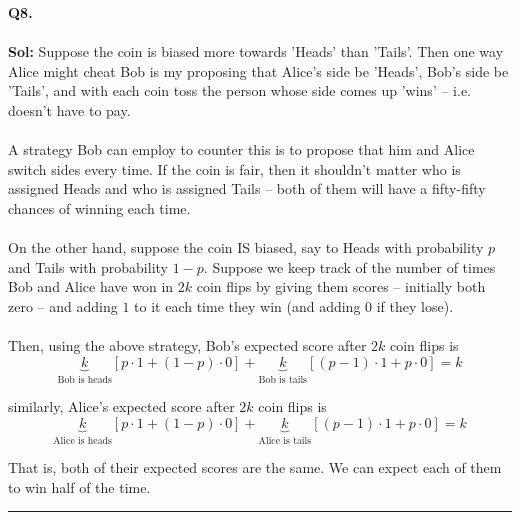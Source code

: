 \documentclass[twoside]{article}
\def\beginrefs{\begin{list}%
        {[\arabic{equation}]}{\usecounter{equation}
         \setlength{\leftmargin}{2.0truecm}\setlength{\labelsep}{0.4truecm}%
         \setlength{\labelwidth}{1.6truecm}}}
\def\endrefs{\end{list}}
\def\bibentry#1{\item[\hbox{[#1]}]}
\begin{document}
\textbf{Q8.} 
\\
\\
\textbf{Sol:} Suppose the coin is biased more towards 'Heads' than 'Tails'. Then one way Alice might cheat Bob is my proposing that Alice's side be 'Heads', Bob's side be 'Tails', and with each coin toss the person whose side comes up 'wins' -- i.e. doesn't have to pay.
\\
\\
A strategy Bob can employ to counter this is to propose that him and Alice switch sides every time. If the coin is fair, then it shouldn't matter who is assigned Heads and who is assigned Tails -- both of them will have a fifty-fifty chances of winning each time. 
\\
\\
On the other hand, suppose the coin IS biased, say to Heads with probability $p$ and Tails with probability $1-p$. Suppose we keep track of the number of times Bob and Alice have won in $2k$ coin flips by giving them scores -- initially both zero -- and adding $1$ to it each time they win (and adding $0$ if they lose).
\\
\\
Then, using the above strategy, Bob's expected score after $2k$ coin flips is 
\[ \underbrace{k}_\text{Bob is heads} [p \cdot 1 + (1-p) \cdot 0] + \underbrace{k}_\text{Bob is tails} [(p-1)\cdot 1 + p \cdot 0] = k \]

similarly, Alice's expected score after $2k$ coin flips is 
\[ \underbrace{k}_\text{Alice is heads}[p \cdot 1 + (1-p) \cdot 0] + \underbrace{k}_\text{Alice is tails}[(p-1) \cdot 1 + p \cdot 0] = k \]

That is, both of their expected scores are the same. We can expect each of them to win half of the time.
\vskip 0.25cm
\hrule
\vskip 1cm





\end{document}
